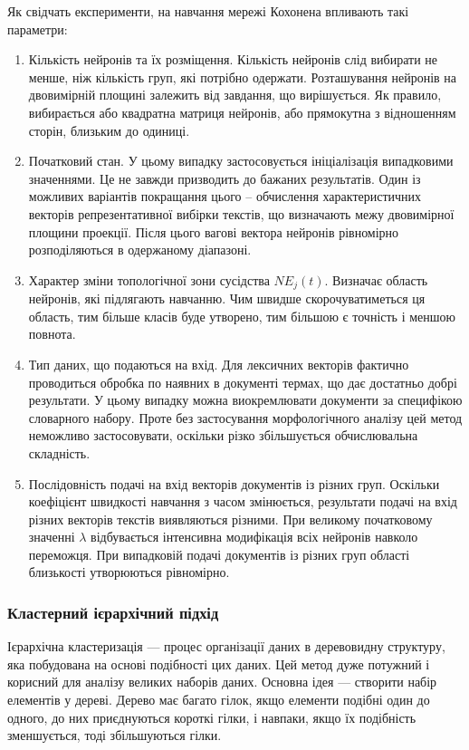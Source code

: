 Як свідчать експерименти, на навчання мережі Кохонена впливають такі параметри:
\begin{enumerate}
	\item Кількість нейронів та їх розміщення. Кількість нейронів слід вибирати не менше, ніж кількість груп, які потрібно одержати. Розташування нейронів на двовимірній площині залежить від завдання, що вирішується. Як правило, вибирається або квадратна матриця нейронів, або прямокутна з відношенням сторін, близьким до одиниці. 
	\item Початковий стан. У цьому випадку застосовується ініціалізація випадковими значеннями. Це не завжди призводить до бажаних результатів. Один із можливих варіантів покращання цього – обчислення характеристичних векторів репрезентативної вибірки текстів, що визначають межу двовимірної площини проекції. Після цього вагові вектора нейронів рівномірно розподіляються в одержаному діапазоні. 
	\item Характер зміни топологічної зони сусідства $NE_{j}(t)$. Визначає область нейронів, які підлягають навчанню. Чим швидше скорочуватиметься ця область, тим більше класів буде утворено, тим більшою є точність і меншою повнота. 
	\item Тип даних, що подаються на вхід. Для лексичних векторів фактично проводиться обробка по наявних в документі термах, що дає достатньо добрі результати. У цьому випадку можна виокремлювати документи за специфікою словарного набору. Проте без застосування морфологічного аналізу цей метод неможливо застосовувати, оскільки різко збільшується обчислювальна складність. 
	\item Послідовність подачі на вхід векторів документів із різних груп. Оскільки коефіцієнт швидкості навчання з часом змінюється, результати подачі на вхід різних векторів текстів виявляються різними. При великому початковому значенні $\lambda$ відбувається інтенсивна модифікація всіх нейронів навколо переможця. При випадковій подачі документів із різних груп області близькості утворюються рівномірно. 
\end{enumerate}

\subsubsection{Кластерний ієрархічний підхід}
Ієрархічна кластеризація — процес організації даних в деревовидну структуру, яка побудована на основі подібності цих даних. Цей метод дуже потужний і корисний для аналізу великих наборів даних. Основна ідея — створити набір елементів у дереві. Дерево має багато гілок, якщо елементи подібні один до одного, до них приєднуються короткі гілки, і навпаки, якщо їх подібність зменшується, тоді збільшуються гілки.

